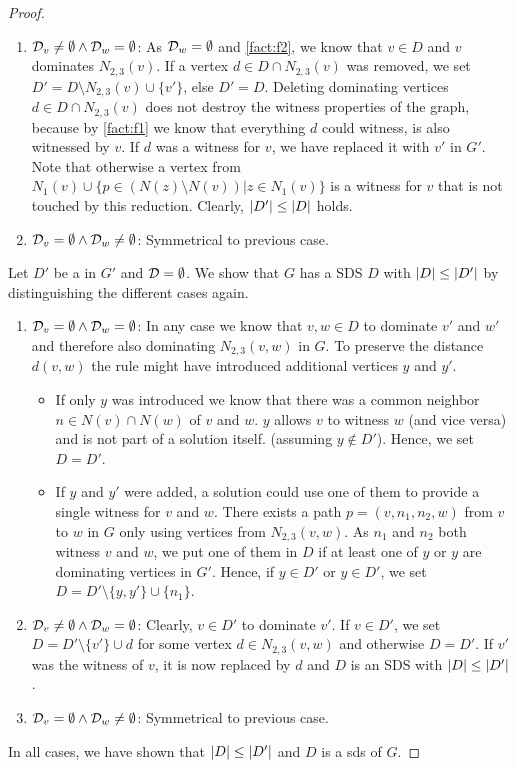 \begin{proof}
\begin{enumerate}
            \item  $ \mathcal{D}_{v} \neq \emptyset  \wedge \mathcal{D}_{w} = \emptyset$: As $\mathcal{D}_{w} = \emptyset$ and \cref{fact:f2}, we know that $v \in D$ and $v$ dominates $N_{2,3}(v)$. 
            If a vertex $d \in D \cap N_{2,3}(v)$ was removed, we set $D' = D \setminus N_{2,3}(v) \cup \{v'\}$, else $D' = D$.
            Deleting dominating vertices $d \in D \cap N_{2,3}(v)$ does not destroy the witness properties of the graph, because by \cref{fact:f1} we know that everything $d$ could witness, is also witnessed by $v$. 
            If $d$ was a witness for $v$, we have replaced it with $v'$ in $G'$.
            Note that otherwise a vertex from $N_1(v) \cup \{ p \in (N(z) \setminus N(v)) | z \in N_1(v) \}$ is a witness for $v$ that is not touched by this reduction. Clearly, $\abs{D'} \leq \abs{D}$ holds.
            \item  $ \mathcal{D}_{v} = \emptyset  \wedge \mathcal{D}_{w} \neq  \emptyset $: Symmetrical to previous case.
        \end{enumerate}

        Let $D'$ be a \sdom in $G'$ and $\mathcal{D} =  \emptyset$. We show that $G$ has a SDS $D$ with $\abs{D} \leq \abs{D'}$ by distinguishing the different cases again. 
        \begin{enumerate}
            \item  $\mathcal{D}_{v} = \emptyset \wedge \mathcal{D}_{w} = \emptyset$: In any case we know that $v,w \in D$ to dominate $v'$ and $w'$ and therefore also dominating $N_{2,3}(v,w)$ in $G$. To preserve the distance $d(v,w)$ the rule might have introduced additional vertices $y$ and $y'$.            
            \begin{itemize}
                \item If only $y$ was introduced we know that there was a common neighbor $n \in N(v) \cap N(w)$ of $v$ and $w$. $y$ allows $v$ to witness $w$ (and vice versa) and is not part of a solution itself. (assuming $y \notin D'$). Hence, we set $D = D'$.
                \item If $y$ and $y'$ were added, a solution could use one of them to provide a single witness for $v$ and $w$. There exists a path $p = (v, n_1, n_2, w)$ from $v$ to $w$ in $G$ only using vertices from $N_{2,3}(v,w)$. As $n_1$ and $n_2$ both witness $v$ and $w$, we put one of them in $D$ if at least one of $y$ or $y$ are dominating vertices in $G'$.
                Hence, if $y \in D'$ or $y \in D'$, we set $D = D' \setminus \{y,y'\} \cup \{n_1\}$.
            \end{itemize}
            \item  $\mathcal{D}_{v} \neq \emptyset \wedge \mathcal{D}_{w} = \emptyset$: Clearly, $v \in D'$ to dominate $v'$. If $v \in D'$, we set $D =  D' \setminus \{v'\} \cup d$ for some vertex $d \in N_{2,3}(v,w)$ and otherwise $D = D'$. If $v'$ was the witness of $v$, it is now replaced by $d$ and $D$ is an SDS with $\abs{D} \leq \abs{D'}$.
            \item  $\mathcal{D}_{v} = \emptyset \wedge \mathcal{D}_{w} \neq \emptyset$: Symmetrical to previous case.
        \end{enumerate} 
        In all cases, we have shown that $\abs{D} \leq \abs{D'}$ and $D$ is a sds of $G$.

\end{proof}
